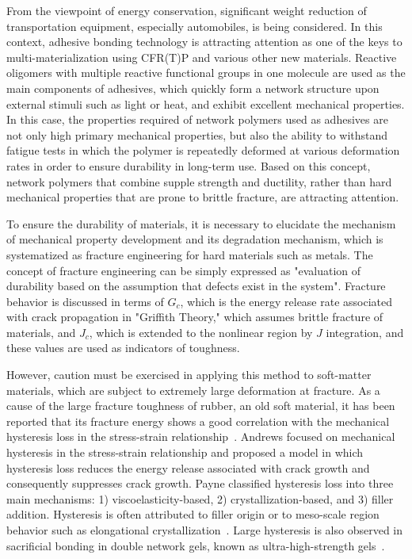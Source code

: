 \documentclass[uplatex,dvipdfmx,a4paper,10pt]{jsarticle}
\makeatletter
\def\subsection{\@startsection{subsection}{2}{\z@}{0.2\Cvs \@plus.5\Cdp \@minus.2\Cdp}{0.1\Cvs \@plus.3\Cdp}{\reset@font\normalsize\bfseries}}
\makeatother
\begin{document}
\newpage

From the viewpoint of energy conservation, significant weight reduction of transportation equipment, especially automobiles, is being considered. In this context, adhesive bonding technology is attracting attention as one of the keys to multi-materialization using CFR(T)P and various other new materials.
Reactive oligomers with multiple reactive functional groups in one molecule are used as the main components of adhesives, which quickly form a network structure upon external stimuli such as light or heat, and exhibit excellent mechanical properties.
In this case, the properties required of network polymers used as adhesives are not only high primary mechanical properties, but also the ability to withstand fatigue tests in which the polymer is repeatedly deformed at various deformation rates in order to ensure durability in long-term use. Based on this concept, network polymers that combine supple strength and ductility, rather than hard mechanical properties that are prone to brittle fracture, are attracting attention.


\subsection{力学的ヒステリシスの重要性}

To ensure the durability of materials, it is necessary to elucidate the mechanism of mechanical property development and its degradation mechanism, which is systematized as fracture engineering for hard materials such as metals.
The concept of fracture engineering can be simply expressed as "evaluation of durability based on the assumption that defects exist in the system". Fracture behavior is discussed in terms of $G_c$, which is the energy release rate associated with crack propagation in "Griffith Theory," which assumes brittle fracture of materials, and $J_c$, which is extended to the nonlinear region by $J$ integration, and these values are used as indicators of toughness.

However, caution must be exercised in applying this method to soft-matter materials, which are subject to extremely large deformation at fracture.
As a cause of the large fracture toughness of rubber, an old soft material, it has been reported that its fracture energy shows a good correlation with the mechanical hysteresis loss in the stress-strain relationship~\cite{payne1}.
Andrews focused on mechanical hysteresis in the stress-strain relationship and proposed a model in which hysteresis loss reduces the energy release associated with crack growth and consequently suppresses crack growth.
Payne classified hysteresis loss into three main mechanisms: 1) viscoelasticity-based, 2) crystallization-based, and 3) filler addition.
Hysteresis is often attributed to filler origin or to meso-scale region behavior such as elongational crystallization~\cite{zhang, Igarashi2013}.
Large hysteresis is also observed in sacrificial bonding in double network gels, known as ultra-high-strength gels~\cite{Gong2010}.
\end{document}
